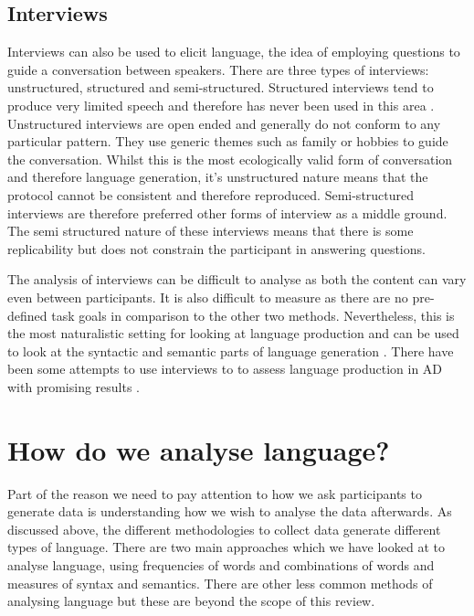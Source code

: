 \documentclass[a4paper]{article}
\begin{document}
\subsection{Interviews}
Interviews can also be used to elicit language, the idea of employing questions to guide a conversation between speakers. There are three types of interviews: unstructured, structured and semi-structured. Structured interviews tend to produce very limited speech and therefore has never been used in this area \cite{Boschi2017}. Unstructured interviews are open ended and generally do not conform to any particular pattern. They use generic themes such as family or hobbies to guide the conversation. Whilst this is the most ecologically valid form of conversation and therefore language generation, it's unstructured nature means that the protocol cannot be consistent and therefore reproduced. Semi-structured interviews are therefore preferred other forms of interview as a middle ground. The semi structured nature of these interviews means that there is some replicability but does not constrain the participant in answering questions. \newline
\par
The analysis of interviews can be difficult to analyse as both the content can vary even between participants. It is also difficult to measure as there are no pre-defined task goals in comparison to the other two methods. Nevertheless, this is the most naturalistic setting for looking at language production and can be used to look at the syntactic and semantic parts of language generation \cite{Sajjadi2012}. There have been some attempts to use interviews to to assess language production in AD with promising results \cite{Asgari2017, Guinn2015}.\newline
\par
\section{How do we analyse language?}
Part of the reason we need to pay attention to how we ask participants to generate data is understanding how we wish to analyse the data afterwards. As discussed above, the different methodologies to collect data generate different types of language. There are two main approaches which we have looked at to analyse language, using frequencies of words and combinations of words and measures of syntax and semantics. There are other less common methods of analysing language but these are beyond the scope of this review. \newline
\par
\end{document}
